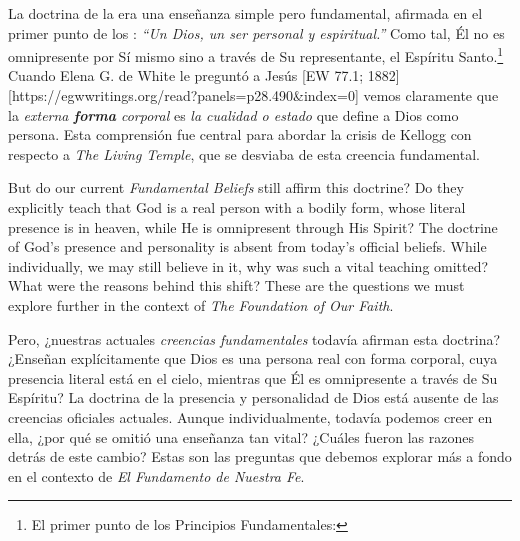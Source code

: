 La doctrina de la  era una enseñanza simple pero fundamental, afirmada en el primer punto de los : \textit{“Un Dios, un ser personal y espiritual.”} Como tal, Él no es omnipresente por Sí mismo sino a través de Su representante, el Espíritu Santo.\footnote{El primer punto de los Principios Fundamentales: } Cuando Elena G. de White le preguntó a Jesús [EW 77.1; 1882][https://egwwritings.org/read?panels=p28.490&index=0] vemos claramente que la \textit{externa \textbf{forma} corporal} es \textit{la cualidad o estado} que define a Dios como persona. Esta comprensión fue central para abordar la crisis de Kellogg con respecto a \textit{The Living Temple}, que se desviaba de esta creencia fundamental.


But do our current \textit{Fundamental Beliefs} still affirm this doctrine? Do they explicitly teach that God is a real person with a bodily form, whose literal presence is in heaven, while He is omnipresent through His Spirit? The doctrine of God’s presence and personality is absent from today’s official beliefs. While individually, we may still believe in it, why was such a vital teaching omitted? What were the reasons behind this shift? These are the questions we must explore further in the context of \textit{The Foundation of Our Faith}.


Pero, ¿nuestras actuales \textit{creencias fundamentales} todavía afirman esta doctrina? ¿Enseñan explícitamente que Dios es una persona real con forma corporal, cuya presencia literal está en el cielo, mientras que Él es omnipresente a través de Su Espíritu? La doctrina de la presencia y personalidad de Dios está ausente de las creencias oficiales actuales. Aunque individualmente, todavía podemos creer en ella, ¿por qué se omitió una enseñanza tan vital? ¿Cuáles fueron las razones detrás de este cambio? Estas son las preguntas que debemos explorar más a fondo en el contexto de \textit{El Fundamento de Nuestra Fe}.







